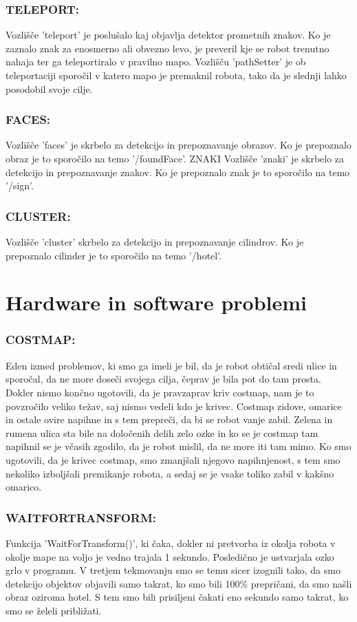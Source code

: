 \documentclass{llncs}
\begin{document}
\subsubsection{TELEPORT:} Vozlišče 'teleport' je poslušalo kaj objavlja detektor prometnih znakov. Ko je zaznalo znak za enosmerno ali obvezno levo, je preveril kje se robot trenutno nahaja ter ga teleportiralo v pravilno mapo. Vozlišču 'pathSetter' je ob teleportaciji sporočil v katero mapo je premaknil robota, tako da je slednji lahko posodobil svoje cilje.
\subsubsection{FACES:} Vozlišče 'faces' je skrbelo za detekcijo in prepoznavanje obrazov. Ko je prepoznalo obraz je to sporočilo na temo '/foundFace'.
ZNAKI Vozlišče 'znaki' je skrbelo za detekcijo in prepoznavanje znakov. Ko je prepoznalo znak je to sporočilo na temo '/sign'.
\subsubsection{CLUSTER:} Vozlišče 'cluster' skrbelo za detekcijo in prepoznavanje cilindrov. Ko je prepoznalo cilinder je to sporočilo na temo '/hotel'.







\section{Hardware in software problemi}
\subsubsection{COSTMAP:} Eden izmed problemov, ki smo ga imeli je bil, da je robot obtičal sredi ulice in sporočal, da ne more doseči svojega cilja, čeprav je bila pot do tam prosta. Dokler nismo končno ugotovili, da je pravzaprav kriv costmap, nam je to povzročilo veliko težav, saj nismo vedeli kdo je krivec.
Costmap zidove, omarice in ostale ovire napihne in s tem prepreči, da bi se robot vanje zabil. Zelena in rumena ulica sta bile na določenih delih zelo ozke in ko se je costmap tam napihnil se je včasih zgodilo, da je robot mislil, da ne more iti tam mimo. Ko smo ugotovili, da je krivec costmap, smo zmanjšali njegovo napihnjenost, s tem smo nekoliko izboljšali premikanje robota, a sedaj se je vsake toliko zabil v kakšno omarico. 
\subsubsection{WAITFORTRANSFORM:} Funkcija 'WaitForTransform()', ki čaka, dokler ni pretvorba iz okolja robota v okolje mape na voljo je vedno trajala 1 sekundo. Posledično je ustvarjala ozko grlo v programu. V tretjem tekmovanju smo se temu sicer izognili tako, da smo detekcijo objektov objavili samo takrat, ko smo bili 100\% prepričani, da smo našli obraz oziroma hotel. S tem smo bili prisiljeni čakati eno sekundo samo takrat, ko smo se želeli približati. 
\end{document}
